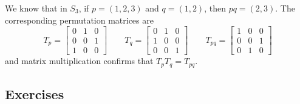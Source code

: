 \begin{example}
  We know that in $S_{3}$, if $p = (1,2,3)$ and $q = (1,2)$, then $pq = (2,3)$.
  The corresponding permutation matrices are
  \[
    T_{p} = \begin{bmatrix}
      0 & 1 & 0\\
      0 & 0 & 1\\
      1 & 0 & 0
    \end{bmatrix}
    \qquad
    T_{q} = \begin{bmatrix}
      0 & 1 & 0\\
      1 & 0 & 0\\
      0 & 0 & 1
    \end{bmatrix}
    \qquad
    T_{pq} = \begin{bmatrix}
      1 & 0 & 0\\
      0 & 0 & 1\\
      0 & 1 & 0
    \end{bmatrix}
  \]
  and matrix multiplication confirms that $T_{p}T_{q} = T_{pq}$.
\end{example}

\subsection*{Exercises}


